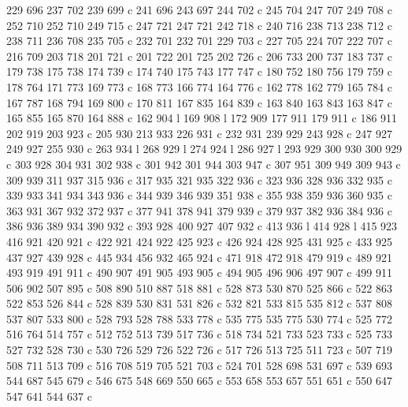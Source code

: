 {{        229 696 237 702 239 699 c
        241 696 243 697 244 702 c
        245 704 247 707 249 708 c
        252 710 252 710 249 715 c
        247 721 247 721 242 718 c
        240 716 238 713 238 712 c
        238 711 236 708 235 705 c
        232 701 232 701 229 703 c
        227 705 224 707 222 707 c
        216 709 203 718 201 721 c
        201 722 201 725 202 726 c
        206 733 200 737 183 737 c
        179 738 175 738 174 739 c
        174 740 175 743 177 747 c
        180 752 180 756 179 759 c
        178 764 171 773 169 773 c
        168 773 166 774 164 776 c
        162 778 162 779 165 784 c
        167 787 168 794 169 800 c
        170 811 167 835 164 839 c
        163 840 163 843 163 847 c
        165 855 165 870 164 888 c
        162 904 l
        169 908 l
        172 909 177 911 179 911 c
        186 911 202 919 203 923 c
        205 930 213 933 226 931 c
        232 931 239 929 243 928 c
        247 927 249 927 255 930 c
        263 934 l
        268 929 l
        274 924 l
        286 927 l
        293 929 300 930 300 929 c
        303 928 304 931 302 938 c
        301 942 301 944 303 947 c
        307 951 309 949 309 943 c
        309 939 311 937 315 936 c
        317 935 321 935 322 936 c
        323 936 328 936 332 935 c
        339 933 341 934 343 936 c
        344 939 346 939 351 938 c
        355 938 359 936 360 935 c
        363 931 367 932 372 937 c
        377 941 378 941 379 939 c
        379 937 382 936 384 936 c
        386 936 389 934 390 932 c
        393 928 400 927 407 932 c
        413 936 l
        414 928 l
        415 923 416 921 420 921 c
        422 921 424 922 425 923 c
        426 924 428 925 431 925 c
        433 925 437 927 439 928 c
        445 934 456 932 465 924 c
        471 918 472 918 479 919 c
        489 921 493 919 491 911 c
        490 907 491 905 493 905 c
        494 905 496 906 497 907 c
        499 911 506 902 507 895 c
        508 890 510 887 518 881 c
        528 873 530 870 525 866 c
        522 863 522 853 526 844 c
        528 839 530 831 531 826 c
        532 821 533 815 535 812 c
        537 808 537 807 533 800 c
        528 793 528 788 533 778 c
        535 775 535 775 530 774 c
        525 772 516 764 514 757 c
        512 752 513 739 517 736 c
        518 734 521 733 523 733 c
        525 733 527 732 528 730 c
        530 726 529 726 522 726 c
        517 726 513 725 511 723 c
        507 719 508 711 513 709 c
        516 708 519 705 521 703 c
        524 701 528 698 531 697 c
        539 693 544 687 545 679 c
        546 675 548 669 550 665 c
        553 658 553 657 551 651 c
        550 647 547 641 544 637 c
}}

